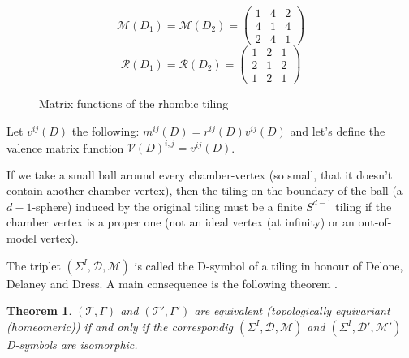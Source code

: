 \documentclass[12pt,a4paper]{article}
\numberwithin{equation}{section}
\theoremstyle{plain}%
\newtheorem{thm}{Theorem}[section]
\theoremstyle{definition}
\theoremstyle{remark}
\begin{document}
\begin{figure}
  \caption{\label{fig:rhombic_mx} Matrix functions of the rhombic tiling}
  \begin{equation*}
    \mathcal{M}(D_1)=\mathcal{M}(D_2)=
    \left(
    \begin{array}{cccc}
      1 & 4 & 2\\
      4 & 1 & 4\\
      2 & 4 & 1
    \end{array}
    \right)
  \end{equation*}
  \begin{equation*}
    \mathcal{R}(D_1)=\mathcal{R}(D_2)=
    \left(
    \begin{array}{cccc}
      1 & 2 & 1\\
      2 & 1 & 2\\
      1 & 2 & 1
    \end{array}
    \right)
  \end{equation*}
\end{figure}

Let $v^{ij}(D)$ the following: $m^{ij}(D)=r^{ij}(D)v^{ij}(D)$ and
let's define the valence matrix function
$\mathcal{V}(D)^{i,j}=v^{ij}(D)$.


If we take a small ball around every chamber-vertex (so small, that it doesn't
contain another chamber vertex), then the tiling on the boundary of the ball (a
$d-1$-sphere)
induced by the original tiling must be a finite $S^{d-1}$ tiling \cite{D87} if the
chamber vertex is a proper one (not an ideal vertex (at infinity) or an
out-of-model vertex).

The triplet $(\Sigma^I,\mathcal{D},\mathcal{M})$ is called the D-symbol of a
tiling in honour of Delone, Delaney and Dress. A main consequence is the
following theorem \cite{D87}.
\begin{thm}
$(\mathcal{T},\Gamma)$ and
$(\mathcal{T}',\Gamma')$ are equivalent (topologically equivariant (homeomeric))
if and only if the correspondig $(\Sigma^I,\mathcal{D},\mathcal{M})$ and
$(\Sigma^I,\mathcal{D}',\mathcal{M}')$ D-symbols are isomorphic.
\end{thm}
\end{document}
